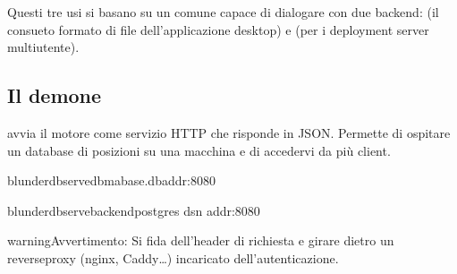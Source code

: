\documentclass[letterpaper,10pt,italian]{sphinxmanual}
\begin{document}
\sphinxAtStartPar
Questi tre usi si basano su un  comune capace di dialogare con due backend:  (il consueto formato di file  dell’applicazione desktop) e  (per i deployment server multiutente).


\subsection{Il demone }
\label{\detokenize{mode_headless:le-demon-serve}}\label{\detokenize{mode_headless:headless-serve}}
\sphinxAtStartPar
{} avvia il motore come servizio HTTP che risponde in JSON. Permette di ospitare un database di posizioni su una macchina e di accedervi da più client.

\begin{sphinxVerbatim}[commandchars=\\\{\}]
blunderdbserve\PYGZhy{}\PYGZhy{}dbma\PYGZus{}base.db\PYGZhy{}\PYGZhy{}addr:8080

blunderdbserve\PYGZhy{}\PYGZhy{}backendpostgres
\PYGZhy{}\PYGZhy{}dsn
\PYGZhy{}\PYGZhy{}addr:8080
\end{sphinxVerbatim}

\begin{sphinxadmonition}{warning}{Avvertimento:}
\sphinxAtStartPar
{} Si fida dell’header di richiesta  e  girare dietro un reverse\sphinxhyphen{}proxy (nginx, Caddy…) incaricato dell’autenticazione. 
\end{sphinxadmonition}

\sphinxAtStartPar
{}
\end{document}

